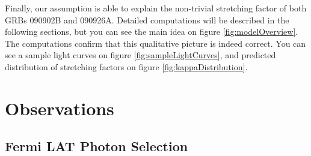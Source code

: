 \documentclass{article}
\begin{document}
	Finally, our assumption is able to explain the non-trivial stretching factor of both GRBs 090902B and 090926A.
	Detailed computations will be described in the following sections, but you can see the main idea on figure \ref{fig:modelOverview}.
	The computations confirm that this qualitative picture is indeed correct.
	You can see a sample light curves on figure \ref{fig:sampleLightCurves}, and predicted distribution of stretching factors on figure \ref{fig:kappaDistribution}.

\section{Observations}
\label{sec:observations}

\subsection{Fermi LAT Photon Selection}
\label{sec:photonSelection}
\end{document}
